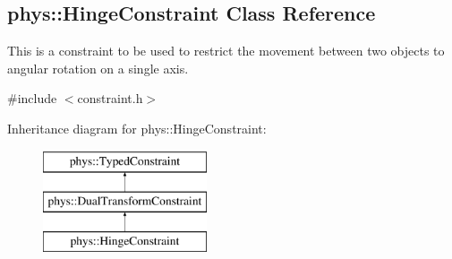 \hypertarget{classphys_1_1HingeConstraint}{
\subsection{phys::HingeConstraint Class Reference}
\label{classphys_1_1HingeConstraint}
}


This is a constraint to be used to restrict the movement between two objects to angular rotation on a single axis.  




{\ttfamily \#include $<$constraint.h$>$}

Inheritance diagram for phys::HingeConstraint:\begin{figure}[H]
\begin{center}
\leavevmode
\includegraphics[height=3.000000cm]{classphys_1_1HingeConstraint}
\end{center}
\end{figure}
